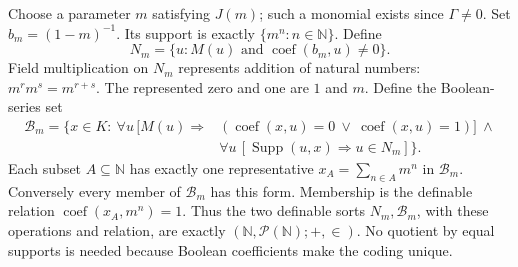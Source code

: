 \documentclass[11pt,oneside]{article}
\numberwithin{equation}{section}
\theoremstyle{definition}
\theoremstyle{remark}
\newcommand{\N}{\mathbb N}
\newcommand{\coef}{\operatorname{coef}}
\DeclareMathOperator{\Supp}{Supp}
\begin{document}
Choose a parameter $m$ satisfying $J(m)$; such a monomial exists since
$\Gamma\ne0$. Set $b_m=(1-m)^{-1}$. Its support is exactly
$\{m^n:n\in\N\}$. Define
\[
 N_m=\{u:M(u)\text{ and }\coef(b_m,u)\ne0\}.
\]
Field multiplication on $N_m$ represents addition of natural numbers:
$m^r m^s=m^{r+s}$. The represented zero and one are $1$ and $m$.
Define the Boolean-series set
\begin{equation}\label{dsup:eq:Booleanseries}
 \begin{split}
 \mathcal B_m=\{x\in K:\ \forall u\,[M(u)\Rightarrow{}&
 (\coef(x,u)=0\ \lor\ \coef(x,u)=1)]\ \land{}\\[-2pt]
 &\forall u\,[\Supp(u,x)\Rightarrow u\in N_m]\}.
 \end{split}
\end{equation}
Each subset $A\subseteq\N$ has exactly one representative
$x_A=\sum_{n\in A}m^n$ in $\mathcal B_m$. Conversely every member of
$\mathcal B_m$ has this form. Membership is the definable relation
$\coef(x_A,m^n)=1$. Thus the two definable sorts $N_m,\mathcal B_m$,
with these operations and relation, are exactly
$(\N,\mathcal P(\N);+,\in)$. No quotient by equal supports is needed
because Boolean coefficients make the coding unique.
\end{document}
